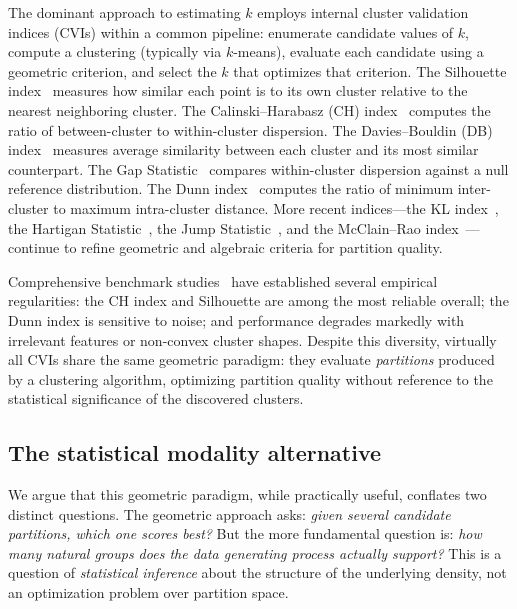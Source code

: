 \documentclass[journal]{IEEEtran}
\begin{document}
The dominant approach to estimating $k$ employs internal cluster validation indices (CVIs) within a common pipeline: enumerate candidate values of $k$, compute a clustering (typically via $k$-means), evaluate each candidate using a geometric criterion, and select the $k$ that optimizes that criterion. The Silhouette index~\cite{rousseeuw1987silhouettes} measures how similar each point is to its own cluster relative to the nearest neighboring cluster. The Calinski--Harabasz (CH) index~\cite{calinski1974dendrite} computes the ratio of between-cluster to within-cluster dispersion. The Davies--Bouldin (DB) index~\cite{davies1979cluster} measures average similarity between each cluster and its most similar counterpart. The Gap Statistic~\cite{tibshirani2001estimating} compares within-cluster dispersion against a null reference distribution. The Dunn index~\cite{dunn1973fuzzy} computes the ratio of minimum inter-cluster to maximum intra-cluster distance. More recent indices---the KL index~\cite{krzanowski1988criterion}, the Hartigan Statistic~\cite{hartigan1975clustering}, the Jump Statistic~\cite{sugar2003finding}, and the McClain--Rao index~\cite{mcclain1990clustplot}---continue to refine geometric and algebraic criteria for partition quality.

Comprehensive benchmark studies~\cite{arbelaitz2013extensive, demsar2006statistical} have established several empirical regularities: the CH index and Silhouette are among the most reliable overall; the Dunn index is sensitive to noise; and performance degrades markedly with irrelevant features or non-convex cluster shapes. Despite this diversity, virtually all CVIs share the same geometric paradigm: they evaluate \emph{partitions} produced by a clustering algorithm, optimizing partition quality without reference to the statistical significance of the discovered clusters.

\subsection{The statistical modality alternative}
\label{sec:statistical-alternative}

We argue that this geometric paradigm, while practically useful, conflates two distinct questions. The geometric approach asks: \emph{given several candidate partitions, which one scores best?} But the more fundamental question is: \emph{how many natural groups does the data generating process actually support?} This is a question of \emph{statistical inference} about the structure of the underlying density, not an optimization problem over partition space.
\end{document}
